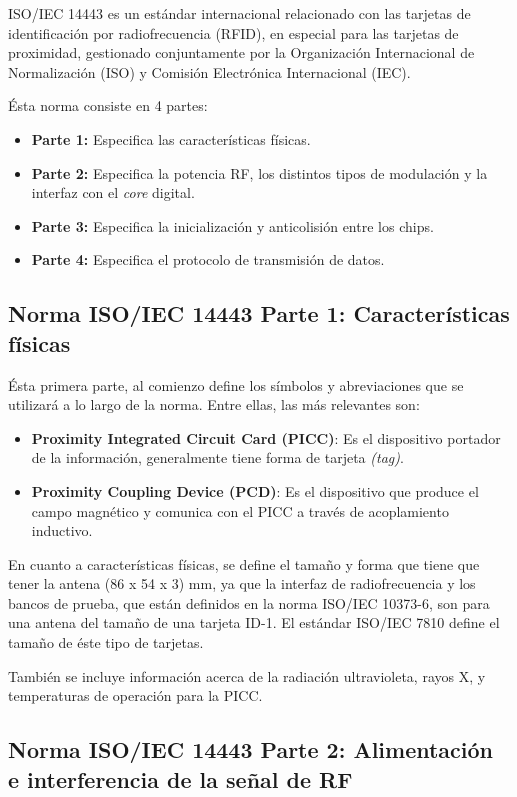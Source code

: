 ISO/IEC 14443 es un estándar internacional relacionado con las tarjetas de identificación por radiofrecuencia (RFID), en especial para las tarjetas de proximidad, gestionado conjuntamente por la Organización Internacional de Normalización (ISO) y Comisión Electrónica Internacional (IEC).

Ésta norma consiste en 4 partes:
\begin{itemize}
	\item \textbf{Parte 1:} Especifica las características físicas.
	\item \textbf{Parte 2:} Especifica la potencia RF, los distintos tipos de modulación y la interfaz con el \textit{core} digital.
	\item \textbf{Parte 3:} Especifica la inicialización y anticolisión entre los chips.
	\item \textbf{Parte 4:} Especifica el protocolo de transmisión de datos. 
\end{itemize}

\subsection{Norma ISO/IEC 14443 Parte 1: Características físicas}

Ésta primera parte, al comienzo define los símbolos y abreviaciones que se utilizará a lo largo de la norma. Entre ellas, las más relevantes son:

\begin{itemize}
	\item \textbf{Proximity Integrated Circuit Card (PICC)}: Es el dispositivo portador de la información, generalmente tiene forma de tarjeta \textit{(tag)}.
	\item \textbf{Proximity Coupling Device (PCD)}: Es el dispositivo que produce el campo magnético y comunica con el PICC a través de acoplamiento inductivo.
\end{itemize}

En cuanto a características físicas, se define el tamaño y forma que tiene que tener la antena (86 x 54 x 3) mm, ya que la interfaz de radiofrecuencia y los bancos de prueba, que están definidos en la norma ISO/IEC 10373-6, son para una antena del tamaño de una tarjeta ID-1. El estándar ISO/IEC 7810 define el tamaño de éste tipo de tarjetas.

También se incluye información acerca de la radiación ultravioleta, rayos X, y temperaturas de operación para la PICC.

\subsection{Norma ISO/IEC 14443 Parte 2: Alimentación e interferencia de la señal de RF}
\label{sec:Norma14443-2}


